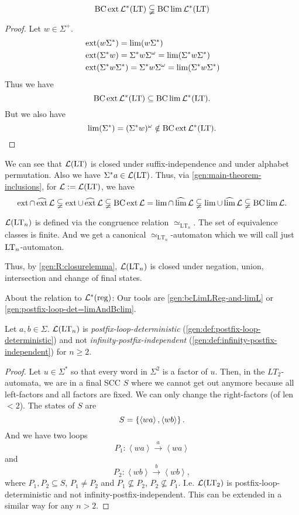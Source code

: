 \begin{theorem}
\[ \operatorname{BC} \operatorname{ext} \mathcal{L}^* (\textup{\textrm{LT}}) \subsetneqq \operatorname{BC} \lim \mathcal{L}^*(\textup{\textrm{LT}})  \]

\begin{proof}
Let $w \in \Sigma^+$.
\begin{align*}
& \operatorname{ext} (w \Sigma^*) = \lim(w \Sigma^*) \\
& \operatorname{ext}( \Sigma^* w) = \Sigma^* w \Sigma^\omega = \lim( \Sigma^* w \Sigma^* ) \\
& \operatorname{ext}( \Sigma^* w \Sigma^*) = \Sigma^* w \Sigma^\omega = \lim( \Sigma^* w \Sigma^* )
\end{align*}
Thus we have
\[ \operatorname{BC} \operatorname{ext} \mathcal{L}^* (\textup{\textrm{LT}}) \subseteq \operatorname{BC} \lim \mathcal{L}^*(\textup{\textrm{LT}}) . \]
But we also have
\[ \lim(\Sigma^*) = (\Sigma^* w)^\omega \notin \operatorname{BC} \operatorname{ext} \mathcal{L}^* (\textup{\textrm{LT}}) . \]
\end{proof}
\end{theorem}

We can see that $\mathcal{L}(\textup{\textrm{LT}})$ is closed under suffix-independence and under alphabet permutation. Also we have $\Sigma^*a \in \mathcal{L}(\textup{\textrm{LT}})$. Thus, via \cref{gen:main-theorem-inclusions}, for $\mathcal{L} := \mathcal{L}(\textup{\textrm{LT}})$, we have
\[ \operatorname{ext} \cap \operatorname{\widehat{ext}} \mathcal{L} \subsetneqq
\operatorname{ext} \cup \operatorname{\widehat{ext}} \mathcal{L} \subsetneqq
\operatorname{BC} \operatorname{ext} \mathcal{L} =
\lim \cap \operatorname{\widehat{lim}} \mathcal{L} \subsetneqq
\lim \cup \operatorname{\widehat{lim}} \mathcal{L} \subsetneqq
\operatorname{BC} \lim \mathcal{L} . \]

$\mathcal{L}(\textup{\textrm{LT}}_n)$ is defined via the congruence relation $\simeq_{\text{LT}_n}$. The set of equivalence classes is finite. And we get a canonical $\simeq_{\text{LT}_n}$-automaton which we will call just $\textup{\textrm{LT}}_n$-automaton.

Thus, by \cref{gen:R:closurelemma}, $\mathcal{L}(\textup{\textrm{LT}}_n)$ is closed under negation, union, intersection and change of final states.


About the relation to $\mathcal{L}^*(\textup{\textrm{reg}})$: Our tools are \cref{gen:bcLimLReg-and-limL} or \cref{gen:postfix-loop-det=limAndBclim}.
\begin{lemma}
Let $a,b \in \Sigma$. $\mathcal{L}(\textup{\textrm{LT}}_n)$ is \emph{postfix-loop-deterministic} (\cref{gen:def:postfix-loop-deterministic}) and not \emph{infinity-postfix-independent} (\cref{gen:def:infinity-postfix-independent}) for $n \ge 2$.
\begin{proof}
Let $u \in \Sigma^*$ so that every word in $\Sigma^2$ is a factor of $u$. Then, in the $LT_2$-automata, we are in a final SCC $S$ where we cannot get out anymore because all left-factors and all factors are fixed. We can only change the right-factors (of len $<2$). The states of $S$ are
\[ S = \Set{\left< wa \right>, \left< wb \right>} . \]
And we have two loops
\[ P_1 : \left< wa \right> \xrightarrow{a} \left< wa \right> \]
and
\[ P_2 : \left< wb \right> \xrightarrow{b} \left< wb \right> , \]
where $P_1,P_2 \subseteq S$, $P_1 \ne P_2$ and $P_1 \not\subseteq P_2$, $P_2 \not\subseteq P_1$. I.e. $\mathcal{L}(\textup{\textrm{LT}}_2)$ is postfix-loop-deterministic and not infinity-postfix-independent.
This can be extended in a similar way for any $n > 2$.
\end{proof}
\end{lemma}


